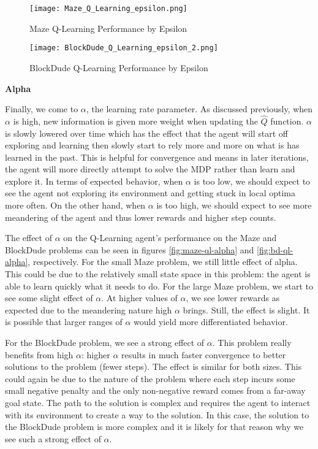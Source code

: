 \documentclass{article}
\begin{document}
\begin{figure}
    \centering
    \begin{minipage}{0.5\textwidth}
        \centering
        \texttt{[image: Maze\_Q\_Learning\_epsilon.png]}
        \caption{Maze Q-Learning Performance by Epsilon}
        \label{fig:maze-ql-epsilon}
    \end{minipage}\hfill
    \begin{minipage}{0.5\textwidth}
        \centering
        \texttt{[image: BlockDude\_Q\_Learning\_epsilon\_2.png]}
        \caption{BlockDude Q-Learning Performance by Epsilon}
        \label{fig:bd-ql-epsilon}
    \end{minipage}
\end{figure}

\textbf{Alpha}

Finally, we come to $\alpha$, the learning rate parameter. As discussed previously, when $\alpha$ is high, new information
is given more weight when updating the $\hat{Q}$ function. $\alpha$ is slowly lowered over time which has the effect that
the agent will start off exploring and learning then slowly start to rely more and more on what is has learned in the past.
This is helpful for convergence and means in later iterations, the agent will more directly attempt to solve the MDP rather
than learn and explore it. In terms of expected behavior, when $\alpha$ is too low, we should expect to see the agent
not exploring its environment and getting stuck in local optima more often. On the other hand, when $\alpha$ is too high, we
should expect to see more meandering of the agent and thus lower rewards and higher step counts.

The effect of $\alpha$ on the Q-Learning agent's performance on the Maze and BlockDude problems can be seen in figures
\ref{fig:maze-ql-alpha} and \ref{fig:bd-ql-alpha}, respectively. For the small Maze problem, we still little effect of alpha.
This could be due to the relatively small state space in this problem: the agent is able to learn quickly what it needs to do.
For the large Maze problem, we start to see some slight effect of $\alpha$. At higher values of $\alpha$, we see lower rewards
as expected due to the meandering nature high $\alpha$ brings. Still, the effect is slight. It is possible that larger ranges of
$\alpha$ would yield more differentiated behavior.

For the BlockDude problem, we see a strong effect of $\alpha$. This problem really benefits from high $\alpha$: higher $\alpha$
results in much faster convergence to better solutions to the problem (fewer steps). The effect is similar for both sizes.
This could again be due to the nature of the problem where each step incurs some small negative penalty and the only non-negative
reward comes from a far-away goal state. The path to the solution is complex and requires the agent to interact with its environment
to create a way to the solution. In this case, the solution to the BlockDude problem is more complex and it is likely for that
reason why we see such a strong effect of $\alpha$.
\end{document}
